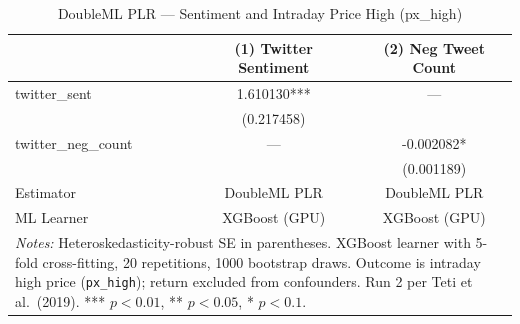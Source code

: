 \begin{table}[htbp]
\centering
\caption{DoubleML PLR --- Sentiment and Intraday Price High (px\_high)\label{tab:dml_pxhigh}}
\begin{tabular}{lcc}
\hline\hline
 & (1) Twitter Sentiment & (2) Neg Tweet Count \\
\hline
twitter\_sent & 1.610130*** & --- \\
& (0.217458) &  \\
twitter\_neg\_count & --- & -0.002082* \\
&  & (0.001189) \\
\hline
Estimator & DoubleML PLR & DoubleML PLR \\
ML Learner & XGBoost (GPU) & XGBoost (GPU) \\
\hline\hline
\multicolumn{3}{p{0.95\linewidth}}{\footnotesize \textit{Notes:} Heteroskedasticity-robust SE in parentheses. XGBoost learner with 5-fold cross-fitting, 20 repetitions, 1000 bootstrap draws. Outcome is intraday high price (\texttt{px\_high}); return excluded from confounders. Run 2 per Teti et al.\ (2019). *** $p<0.01$, ** $p<0.05$, * $p<0.1$.} \\
\end{tabular}
\end{table}